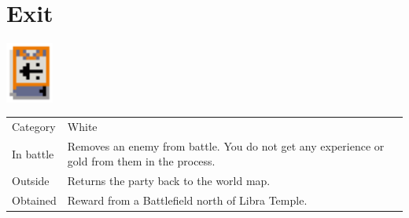 \section{Exit}
\label{spell:exit}

\includegraphics[height=2cm,keepaspectratio]{./resources/spells/exit}

\begin{longtable}{ l p{9cm} }
	Category
	& White
\\ %
	In battle
	& Removes an enemy from battle. You do not get any experience or gold from them in the process.
\\ %
	Outside
	& Returns the party back to the world map.
\\ %
	Obtained
	& Reward from a Battlefield north of Libra Temple.
\end{longtable}
